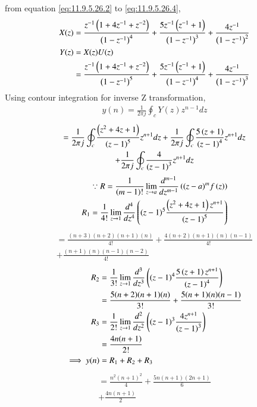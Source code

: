 \documentclass[journal,12pt,twocolumn]{IEEEtran}
\theoremstyle{remark}
\begin{document}
from equation \eqref{eq:11.9.5.26.2} to \eqref{eq:11.9.5.26.4},\\
    \begin{align}
        X(z) &= \frac{z^{-1}\left(1+4z^{-1}+z^{-2}\right)}{\left(1-z^{-1}\right)^4} + \frac{5z^{-1}\left(z^{-1}+1\right)}{\left(1-z^{-1}\right)^3} + \frac{4z^{-1}}{\left(1-z^{-1}\right)^2}\\
         Y(z) &= X(z)U(z)\\
         &= \frac{z^{-1}\left(1+4z^{-1}+z^{-2}\right)}{\left(1-z^{-1}\right)^5} + \frac{5z^{-1}\left(z^{-1}+1\right)}{\left(1-z^{-1}\right)^4} + \frac{4z^{-1}}{\left(1-z^{-1}\right)^3} 
    \end{align}
Using contour integration for inverse Z transformation,
    \begin{align}
        y(n) = \frac{1}{2\pi j}\oint_c Y(z) z^{n-1} dz
    \end{align}
    \begin{multline}
        = \frac{1}{2\pi j}\oint_c \frac{\left(z^2+4z+1\right)}{\left(z-1\right)^5} z^{n+1} dz + \frac{1}{2\pi j}\oint_c \frac{5\left(z+1\right)}{\left(z-1\right)^4} z^{n+1} dz \\
        + \frac{1}{2\pi j}\oint_c \frac{4}{\left(z-1\right)^3} z^{n+1} dz 
    \end{multline}
    \begin{align}
        \because R =\frac{1}{\left(m-1\right)!}\lim\limits_{z\to a}\frac{d^{m-1}}{dz^{m-1}}\left({(z-a)}^{m}f\left(z\right)\right)\\
        R_1 =\frac{1}{4!}\lim\limits_{z\to 1}\frac{d^4}{dz^4}\left((z-1)^5 \frac{\left(z^2+4z+1\right)z^{n+1}}{\left(z-1\right)^5}\right)
    \end{align}
    \begin{multline}
        = \frac{(n+3)(n+2)(n+1)(n)}{4!} + \frac{4(n+2)(n+1)(n)(n-1)}{4!}\\
         + \frac{(n+1)(n)(n-1)(n-2)}{4!}
    \end{multline}
    \begin{align}
        R_2 &=\frac{1}{3!}\lim\limits_{z\to 1}\frac{d^3}{dz^3} \left((z-1)^4 \frac{5\left(z+1\right)z^{n+1}}{\left(z-1\right)^4}\right)\\
        &= \frac{5(n+2)(n+1)(n)}{3!} + \frac{5(n+1)(n)(n-1)}{3!}\\
        R_3 &=\frac{1}{2!}\lim\limits_{z\to 1}\frac{d^2}{dz^2} \left((z-1)^3 \frac{4z^{n+1}}{\left(z-1\right)^3}\right)\\
        &= \frac{4n(n+1)}{2!}\\
        \implies y(n) &= R_1 + R_2 + R_3 
    \end{align}
    \begin{multline}
        = \frac{n^2(n+1)^2}{4} + \frac{5n(n+1)(2n+1)}{6} \\
        + \frac{4n(n+1)}{2}
    \end{multline}
        
\end{document}
